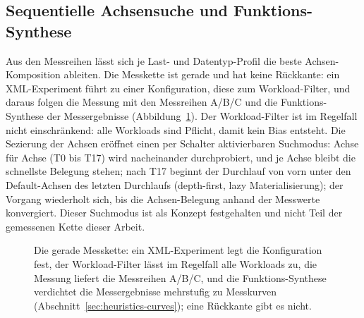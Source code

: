 \begin{nurlang}
\subsection{Sequentielle Achsensuche und Funktions-Synthese}\label{sec:heuristics-loop}
Aus den Messreihen lässt sich je Last- und Datentyp-Profil die beste
Achsen-Komposition ableiten.
Die Messkette ist gerade und hat keine Rückkante: ein XML-Experiment führt zu einer Konfiguration, diese
zum Workload-Filter, und daraus folgen die Messung mit den Messreihen A/B/C und die Funktions-Synthese der
Messergebnisse (Abbildung~\ref{fig:mess-kette}). Der Workload-Filter ist im Regelfall nicht einschränkend:
alle Workloads sind Pflicht, damit kein Bias entsteht. Die Sezierung der Achsen eröffnet einen per Schalter
aktivierbaren Suchmodus: Achse für Achse (T0 bis T17) wird nacheinander durchprobiert, und je Achse bleibt
die schnellste Belegung stehen; nach T17 beginnt der Durchlauf von vorn unter den Default-Achsen des letzten
Durchlaufs (depth-first, lazy Materialisierung); der Vorgang wiederholt sich, bis die Achsen-Belegung anhand
der Messwerte konvergiert. Dieser Suchmodus ist als Konzept
festgehalten und nicht Teil der gemessenen Kette dieser Arbeit.
\begin{figure}[htbp]\centering
{}
\caption{Die gerade Messkette: ein XML-Experiment legt die Konfiguration fest, der Workload-Filter lässt im Regelfall alle Workloads zu, die Messung liefert die Messreihen A/B/C, und die Funktions-Synthese verdichtet die Messergebnisse mehrstufig zu Messkurven (Abschnitt~\ref{sec:heuristics-curves}); eine Rückkante gibt es nicht.}\label{fig:mess-kette}
\end{figure}


\end{nurlang}
